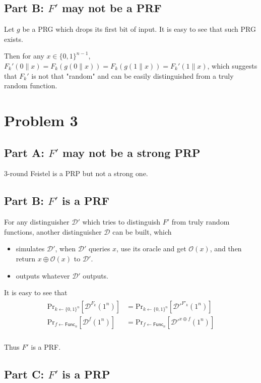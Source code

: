 \documentclass[8pt]{article}
\theoremstyle{compact}
\begin{document}
\subsection*{Part B: $F'$ may not be a PRF}
Let $g$ be a PRG which drops its first bit of input. It is easy to see that such PRG exists.

Then for any $x \in \{0, 1\}^{n-1}$, $F_k'(0 \| x) = F_k(g(0\|x)) = F_k(g(1\|x)) = F_k'(1\|x)$, which suggests that $F_k'$ is not that "random" and can be easily distinguished from a truly random function.

\section*{Problem 3}
\subsection*{Part A: $F'$ may not be a strong PRP}
3-round Feistel is a PRP but not a strong one.
\subsection*{Part B: $F'$ is a PRF}
For any distinguisher $\mathcal D'$ which tries to distinguish $F'$ from truly random functions, another distinguisher $\mathcal D$ can be built, which \begin{itemize}
	\item simulates $\mathcal D'$, when $\mathcal D'$ queries $x$, use its oracle and get $\mathcal O(x)$, and then return $x \oplus \mathcal O(x)$ to $\mathcal D'$.
	\item outputs whatever $\mathcal D'$ outputs.
\end{itemize}

It is easy to see that \begin{align*}
	\begin{split}
		\text{Pr}_{k \gets \{0, 1\}^n}\left[\mathcal D^{F_k}(1^n)\right] &= \text{Pr}_{k \gets \{0, 1\}^n}\left[\mathcal D'^{F'_k}(1^n)\right] \\
		\text{Pr}_{f \gets \textsf{Func}_n}\left[\mathcal D^{f}(1^n)\right] &= \text{Pr}_{f \gets \textsf{Func}_n}\left[\mathcal D'^{x \oplus f}(1^n)\right] \\
	\end{split}
\end{align*}

Thus $F'$ is a PRF.

\subsection*{Part C: $F'$ is a PRP}
\end{document}
